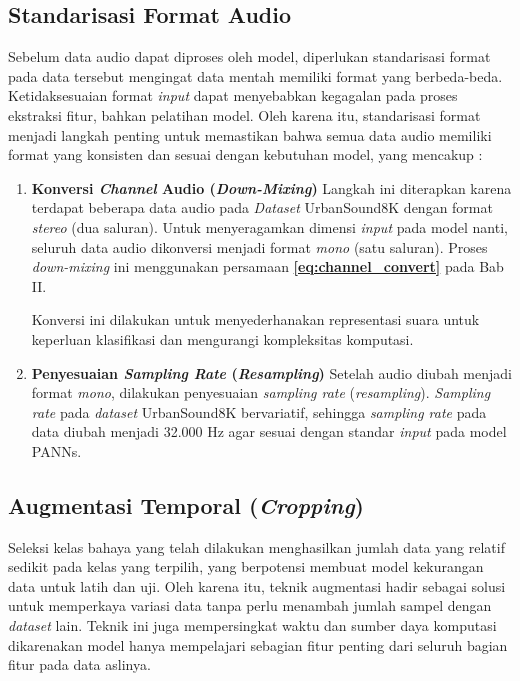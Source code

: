\subsection{Standarisasi Format Audio}
Sebelum data audio dapat diproses oleh model, diperlukan standarisasi format pada data tersebut mengingat data mentah memiliki format yang berbeda-beda.
Ketidaksesuaian format \textit{input} dapat menyebabkan kegagalan pada proses ekstraksi fitur, bahkan pelatihan model.
Oleh karena itu, standarisasi format menjadi langkah penting untuk memastikan bahwa semua data audio memiliki format yang konsisten dan sesuai dengan kebutuhan model, yang mencakup :
\begin{enumerate}
    \item \textbf{Konversi \textit{Channel} Audio (\textit{Down-Mixing})} \newline
    Langkah ini diterapkan karena terdapat beberapa data audio pada \textit{Dataset} UrbanSound8K dengan format \textit{stereo} (dua saluran). 
    Untuk menyeragamkan dimensi \textit{input} pada model nanti, seluruh data audio dikonversi menjadi format \textit{mono} (satu saluran).
    Proses \textit{down-mixing} ini menggunakan persamaan \textbf{\ref{eq:channel_convert}} pada Bab II. \par
    
    Konversi ini dilakukan untuk menyederhanakan representasi suara untuk keperluan klasifikasi dan mengurangi kompleksitas komputasi. \par

    \item \textbf{Penyesuaian \textit{Sampling Rate} (\textit{Resampling})} \newline
    Setelah audio diubah menjadi format \textit{mono}, dilakukan penyesuaian \textit{sampling rate} (\textit{resampling}). \textit{Sampling rate} pada \textit{dataset} UrbanSound8K bervariatif, sehingga \textit{sampling rate} pada data diubah menjadi 32.000 Hz agar sesuai dengan standar \textit{input} pada model PANNs.
\end{enumerate}

\subsection{Augmentasi Temporal (\textit{Cropping})}
Seleksi kelas bahaya yang telah dilakukan menghasilkan jumlah data yang relatif sedikit pada kelas yang terpilih, yang berpotensi membuat model kekurangan data untuk latih dan uji. 
Oleh karena itu, teknik augmentasi hadir sebagai solusi untuk memperkaya variasi data tanpa perlu menambah jumlah sampel dengan \textit{dataset} lain.
Teknik ini juga mempersingkat waktu dan sumber daya komputasi dikarenakan model hanya mempelajari sebagian fitur penting dari seluruh bagian fitur pada data aslinya.\par

